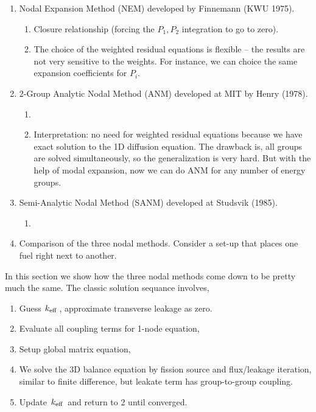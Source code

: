 \documentclass{school-22.211-notes}
\begin{document}
\clearpage
{}
\begin{enumerate}
\item Nodal Expansion Method (NEM) developed by Finnemann (KWU 1975). 
  \begin{enumerate}

  \item Closure relationship (forcing the $P_1, P_2$ integration to go to zero). 

  \item The choice of the weighted residual equations is flexible -- the results are not very sensitive to the weights. For instance, we can choice the same expansion coefficients for $P_i$. 
  \end{enumerate}

\item 2-Group Analytic Nodal Method (ANM) developed at MIT by Henry (1978). 
  \begin{enumerate}
  \item 

  \item Interpretation: no need for weighted residual equations because we have exact solution to the 1D diffusion equation. The drawback is, all groups are solved simultaneously, so the generalization is very hard. But with the help of modal expansion, now we can do ANM for any number of energy groups. 
  \end{enumerate}

\item Semi-Analytic Nodal Method (SANM) developed at Studsvik (1985). 
  \begin{enumerate}
  \item 
  \end{enumerate}

\item Comparison of the three nodal methods. Consider a set-up that places one fuel right next to another. 
\end{enumerate}


\clearpage
{}
In this section we show how the three nodal methods come down to be pretty much the same. The classic solution sequance involves,
\begin{enumerate}
\item Guess $\left. k_{\mathrm{eff}} \right.$, approximate transverse leakage as zero.
\item Evaluate all coupling terms for 1-node equation,

\item Setup global matrix equation,

\item We solve the 3D balance equation by fission source and flux/leakage iteration, similar to finite difference, but leakate term has group-to-group coupling. 

\item Update $\left. k_{\mathrm{eff}} \right.$ and return to 2 until converged. 
\end{enumerate}
\end{document}
